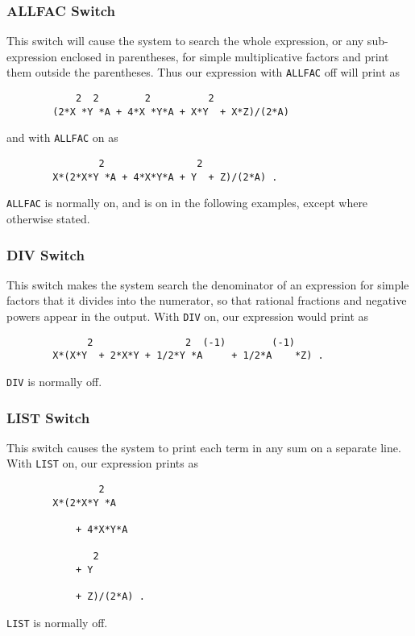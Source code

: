 \subsubsection{ALLFAC Switch}

This switch will cause the system to search the whole expression, or any
sub-expression enclosed in parentheses, for simple multiplicative factors
and print them outside the parentheses. Thus our expression with {\tt ALLFAC}
off will print as
\begin{verbatim}
            2  2        2          2
        (2*X *Y *A + 4*X *Y*A + X*Y  + X*Z)/(2*A)
\end{verbatim}
and with {\tt ALLFAC} on as
\begin{verbatim}
                2                2
        X*(2*X*Y *A + 4*X*Y*A + Y  + Z)/(2*A) .
\end{verbatim}
{\tt ALLFAC} is normally on, and is on in the following examples, except
where otherwise stated.

\subsubsection{DIV Switch}

This switch makes the system search the denominator of an expression for
simple factors that it divides into the numerator, so that rational
fractions and negative powers appear in the output. With {\tt DIV} on, our
expression would print as
\begin{verbatim}
              2                2  (-1)        (-1)
        X*(X*Y  + 2*X*Y + 1/2*Y *A     + 1/2*A    *Z) .
\end{verbatim}
{\tt DIV} is normally off.

\subsubsection{LIST Switch}

This switch causes the system to print each term in any sum on a separate
line. With {\tt LIST} on, our expression prints as
\begin{verbatim}
                2
        X*(2*X*Y *A

            + 4*X*Y*A

               2
            + Y

            + Z)/(2*A) .
\end{verbatim}
{\tt LIST} is normally off.

